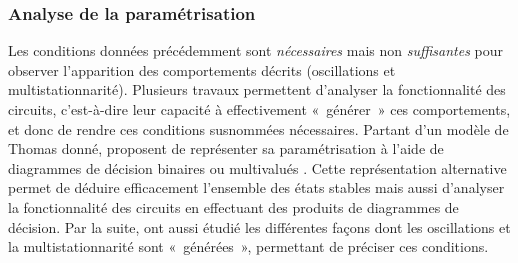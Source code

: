 \subsubsection*{Analyse de la paramétrisation}
Les conditions données précédemment sont \emph{nécessaires} mais non \emph{suffisantes}
pour observer l'apparition des comportements décrits (oscillations et multistationnarité).
Plusieurs travaux permettent d'analyser la fonctionnalité des circuits,
c'est-à-dire leur capacité à effectivement «~générer~» ces comportements,
et donc de rendre ces conditions susnommées nécessaires.
Partant d'un modèle de Thomas donné,
 proposent de représenter sa paramétrisation
à l'aide de diagrammes de décision binaires ou multivalués \cite{Bryant86,Srinivasan90}.
Cette représentation alternative permet de déduire efficacement
l'ensemble des états stables mais aussi d'analyser la fonctionnalité des circuits
en effectuant des produits de diagrammes de décision.
Par la suite, \cite{Comet13} ont aussi étudié les différentes façons
dont les oscillations et la multistationnarité sont «~générées~»,
permettant de préciser ces conditions.


% 
% 
% 
% 
% 

